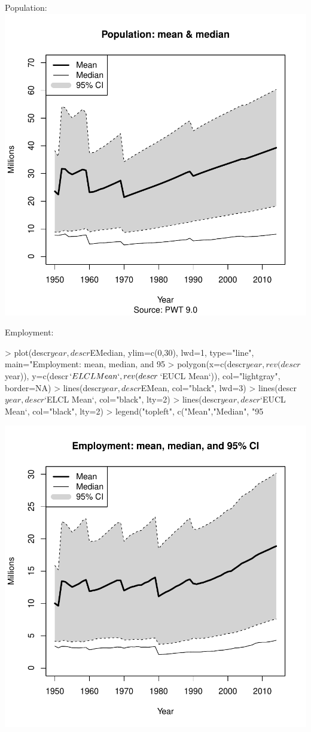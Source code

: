 \documentclass[pt=12]{article}
\begin{document}
Population:
\includegraphics{dhgc-003}

Employment:
\begin{Schunk}
\begin{Sinput}
> plot(descr$year, descr$EMedian, ylim=c(0,30), lwd=1, type="line", main="Employment: mean, median, and 95%
> polygon(x=c(descr$year, rev(descr$year)), y=c(descr$`ELCL Mean`, rev(descr$`EUCL Mean`)), col="lightgray", border=NA)
> lines(descr$year, descr$EMean, col="black", lwd=3)
> lines(descr$year, descr$`ELCL Mean`, col="black", lty=2)
> lines(descr$year, descr$`EUCL Mean`, col="black", lty=2)
> legend("topleft", c("Mean","Median", "95%
\end{Sinput}
\end{Schunk}
\includegraphics{dhgc-004}
\end{document}
